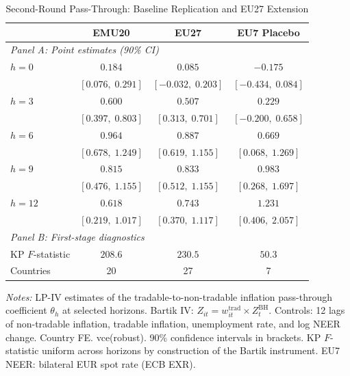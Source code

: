 \begin{table}[htbp]
\centering
\begin{threeparttable}
\caption{Second-Round Pass-Through: Baseline Replication and EU27 Extension}
\label{tab:phase3_comparison}
{\small
\begin{tabular}{lccc}
\toprule
 & EMU20 & EU27 & EU7 Placebo \\
\midrule
\multicolumn{4}{l}{\textit{Panel A: Point estimates (90\% CI)}} \\[4pt]
$h=0$ & $0.184$ & $0.085$ & $-0.175$ \\
      & \footnotesize{$[0.076,\;0.291]$} & \footnotesize{$[-0.032,\;0.203]$} & \footnotesize{$[-0.434,\;0.084]$} \\[2pt]
$h=3$ & $0.600$ & $0.507$ & $0.229$ \\
      & \footnotesize{$[0.397,\;0.803]$} & \footnotesize{$[0.313,\;0.701]$} & \footnotesize{$[-0.200,\;0.658]$} \\[2pt]
$h=6$ & $0.964$ & $0.887$ & $0.669$ \\
      & \footnotesize{$[0.678,\;1.249]$} & \footnotesize{$[0.619,\;1.155]$} & \footnotesize{$[0.068,\;1.269]$} \\[2pt]
$h=9$ & $0.815$ & $0.833$ & $0.983$ \\
      & \footnotesize{$[0.476,\;1.155]$} & \footnotesize{$[0.512,\;1.155]$} & \footnotesize{$[0.268,\;1.697]$} \\[2pt]
$h=12$ & $0.618$ & $0.743$ & $1.231$ \\
      & \footnotesize{$[0.219,\;1.017]$} & \footnotesize{$[0.370,\;1.117]$} & \footnotesize{$[0.406,\;2.057]$} \\[2pt]
\midrule
\multicolumn{4}{l}{\textit{Panel B: First-stage diagnostics}} \\[4pt]
KP $F$-statistic & $208.6$ & $230.5$ & $50.3$ \\
Countries & 20 & 27 & 7 \\
\bottomrule
\end{tabular}
}
\begin{tablenotes}[flushleft]
\footnotesize
\item \textit{Notes:} LP-IV estimates of the tradable-to-non-tradable
inflation pass-through coefficient $\theta_h$ at selected horizons.
Bartik IV: $Z_{it} = w^{\text{trad}}_{it} \times Z^{\text{BH}}_t$.
Controls: 12 lags of non-tradable inflation, tradable inflation,
unemployment rate, and log NEER change. Country FE. vce(robust).
90\% confidence intervals in brackets. KP $F$-statistic uniform
across horizons by construction of the Bartik instrument.
EU7 NEER: bilateral EUR spot rate (ECB EXR).
\end{tablenotes}
\end{threeparttable}
\end{table}
